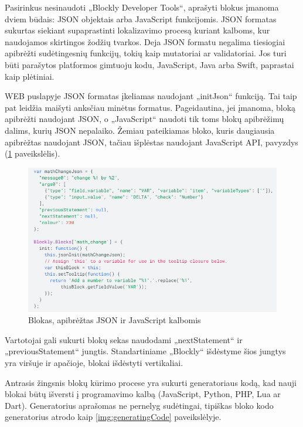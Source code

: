\documentclass{VUMIFPSkursinis}
\begin{document}
Pasirinkus nesinaudoti „Blockly Developer Tools“, aprašyti blokus įmanoma dviem būdais: JSON objektais arba JavaScript funkcijomis. JSON formatas sukurtas siekiant supaprastinti lokalizavimo procesą kuriant kalboms, kur naudojamos skirtingos žodžių tvarkos. Deja JSON formatu negalima tiesiogiai apibrėžti sudėtingesnių funkcijų, tokių kaip mutatoriai ar validatoriai. Jos turi būti parašytos platformos gimtuoju kodu, JavaScript, Java arba Swift, paprastai kaip plėtiniai.

WEB puslapyje JSON formatas įkeliamas naudojant „initJson“ funkciją. Tai taip pat leidžia maišyti anksčiau minėtus formatus. Pageidautina, jei įmanoma, bloką apibrėžti naudojant JSON, o „JavaScript“ naudoti tik toms blokų apibrėžimų dalims, kurių JSON nepalaiko. Žemiau pateikiamas bloko, kuris daugiausia apibrėžtas naudojant JSON, tačiau išplėstas naudojant JavaScript API, pavyzdys (\ref{img:blockJson} paveikslėlis).

\begin{figure}[H]
    \centering
    \includegraphics[scale=0.6]{img/blockJsonJS.png}
    \caption{Blokas, apibrėžtas JSON ir JavaScript kalbomis}
    \label{img:blockJson}
\end{figure}

Vartotojai gali sukurti blokų sekas naudodami „nextStatement“ ir „previousStatement“ jungtis. Standartiniame „Blockly“ išdėstyme šios jungtys yra viršuje ir apačioje, blokai išdėstyti vertikaliai. \cite{define-blocks}

Antrasis žingsnis blokų kūrimo procese yra sukurti generatoriaus kodą, kad nauji blokai būtų išversti į programavimo kalbą (JavaScript, Python, PHP, Lua ar Dart). Generatorius aprašomas ne pernelyg sudėtingai, tipiškas bloko kodo generatorius atrodo kaip \ref{img:generatingCode} paveikslėlyje. \cite{generating-code}
\end{document}
